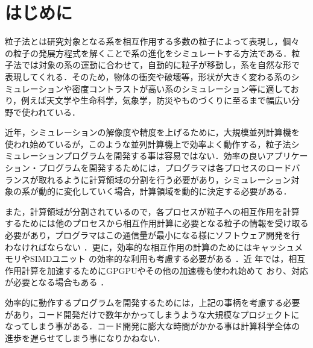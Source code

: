 \documentclass[submit,techreq,noauthor]{ipsj}
\begin{document}

\maketitle

\section{はじめに}

粒子法とは研究対象となる系を相互作用する多数の粒子によって表現し，個々
の粒子の発展方程式を解くことで系の進化をシミュレートする方法である．粒
子法では対象の系の運動に合わせて，自動的に粒子が移動し，系を自然な形で
表現してくれる．そのため，物体の衝突や破壊等，形状が大きく変わる系のシ
ミュレーションや密度コントラストが高い系のシミュレーション等に適してお
り，例えば天文学や生命科学，気象学，防災やものづくりに至るまで幅広い分
野で使われている．

近年，シミュレーションの解像度や精度を上げるために，大規模並列計算機を
使われ始めているが，このような並列計算機上で効率よく動作する，粒子法シ
ミュレーションプログラムを開発する事は容易ではない．効率の良いアプリケー
ション・プログラムを開発するためには，プログラマは各プロセスのロードバ
ランスが取れるように計算領域の分割を行う必要があり，シミュレーション対
象の系が動的に変化していく場合，計算領域を動的に決定する必要がある．

また，計算領域が分割されているので，各プロセスが粒子への相互作用を計算
するためには他のプロセスから相互作用計算に必要となる粒子の情報を受け取る
必要があり，プログラマはこの通信量が最小になる様にソフトウェア開発を行
わなければならない
\cite{1994JCoPh.111..136S,2004PASJ...56..521M,springel:gadget2,ishiyama:greem}
．更に，効率的な相互作用の計算のためにはキャッシュメモリやSIMDユニット
の効率的な利用も考慮する必要がある
\cite{2006NewA...12..169N,2012NewA...17...82T,2013NewA...19...74T}．近
年では，相互作用計算を加速するためにGPGPUやその他の加速機も使われ始めて
おり、対応が必要となる場合もある
\cite{hamada2009novel,Hamada:2009:THN:1654059.1654123,Bedorf:2014:PGT:2683593.2683600}
．

効率的に動作するプログラムを開発するためには，上記の事柄を考慮する必要
があり，コード開発だけで数年かかってしまうような大規模なプロジェクトに
なってしまう事がある．コード開発に膨大な時間がかかる事は計算科学全体の
進歩を遅らせてしまう事になりかねない．
\end{document}
